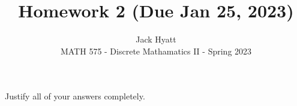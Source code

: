\documentclass[12pt]{article}
\begin{document}
	
	
	
	\title{Homework 2 (Due Jan 25, 2023)}
	\author{Jack Hyatt\\ %
		MATH 575 - Discrete Mathamatics II - Spring 2023} 
	
	\maketitle
	
	Justify all of your answers completely.\\
	
	
	\medskip 
	
	
	
\end{document}
